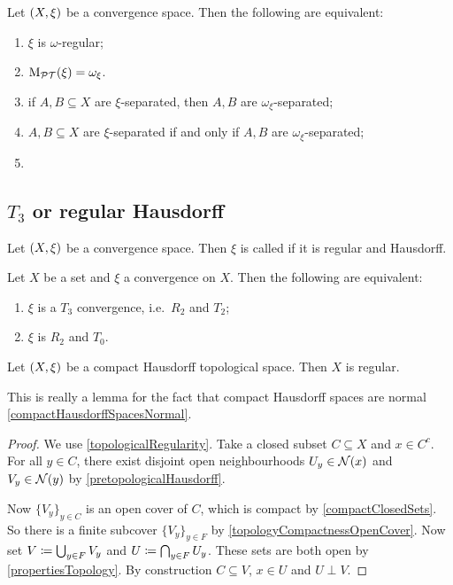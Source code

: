 \begin{proposition}
Let $\sSet{X,\xi}$ be a convergence space. Then the following are equivalent:
\begin{enumerate}
\item $\xi$ is $\omega$-regular;
\item $\operatorname{M_\mathcal{PT}}(\xi) = \omega_\xi$.
\item if $A,B\subseteq X$ are $\xi$-separated, then $A,B$ are $\omega_\xi$-separated;
\item $A,B\subseteq X$ are $\xi$-separated \textup{if and only if} $A,B$ are $\omega_\xi$-separated;
\item 
\end{enumerate}
\end{proposition}

\subsection{$T_3$ or regular Hausdorff}
\begin{definition}
Let $\sSet{X,\xi}$ be a convergence space. Then $\xi$ is called  if it is regular and Hausdorff.
\end{definition}

\begin{proposition}
Let $X$ be a set and $\xi$ a convergence on $X$. Then the following are equivalent:
\begin{enumerate}
\item $\xi$ is a $T_3$ convergence, i.e.\ $R_2$ and $T_2$;
\item $\xi$ is $R_2$ and $T_0$.
\end{enumerate}
\end{proposition}

\begin{lemma} \label{compactHausdorffSpacesRegular}
Let $\sSet{X,\xi}$ be a compact Hausdorff topological space. Then $X$ is regular.
\end{lemma}
This is really a lemma for the fact that compact Hausdorff spaces are normal \ref{compactHausdorffSpacesNormal}.
\begin{proof}
We use \ref{topologicalRegularity}. Take a closed subset $C\subseteq X$ and $x\in C^c$. For all $y\in C$, there exist disjoint open neighbourhoods $U_y \in \operatorname{\mathcal{N}}(x)$ and $V_y\in \operatorname{\mathcal{N}}(y)$ by \ref{pretopologicalHausdorff}.

Now $\{V_y\}_{y\in C}$ is an open cover of $C$, which is compact by \ref{compactClosedSets}. So there is a finite subcover $\{V_y\}_{y\in F}$ by \ref{topologyCompactnessOpenCover}. Now set $V \coloneqq \bigcup_{y\in F}V_y$ and $U \coloneqq \bigcap_{y\in F}U_y$. These sets are both open by \ref{propertiesTopology}. By construction $C\subseteq V$, $x\in U$ and $U\perp V$.
\end{proof}

